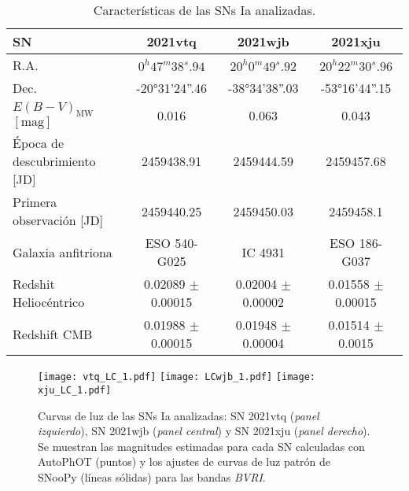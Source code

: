 \documentclass[baaa]{baaa}
\begin{document}
\begin{table*}[t]
\centering
\fontsize{9}{10}\selectfont
\caption{Características de las SNs Ia analizadas.}

\begin{tabular}{lccc}
\hline\hline\noalign{\smallskip}
SN                                                                               & 2021vtq         & 2021wjb         & 2021xju         \\ \hline
R.A.                                                                             & $0^h 47^m 38^s.94$     & $20^h0^m49^s.92$     & $20^h22^m30^s.96$    \\
Dec.                                                                             & -20°31'24''.46 & -38°34'38''.03 & -53°16'44''.15 \\
$E(B-V)_{\mathrm{MW}}$ $[\mathrm{mag}]$ & 0.016 & 0.063  &  0.043 \\
Época de descubrimiento {[}JD{]}                                                 & 2459438.91      & 2459444.59      & 2459457.68      \\
Primera observación {[}JD{]} & 2459440.25      & 2459450.03      & 2459458.1       \\
Galaxia anfitriona                                                                  & ESO 540-G025    & IC 4931         & ESO 186-G037    \\
Redshit Heliocéntrico                                                            & 0.02089 $\pm$ 0.00015 & 0.02004 $\pm$ 0.00002 & 0.01558 $\pm$ 0.00015 \\
Redshift CMB                                                                     & 0.01988 $\pm$ 0.00015 & 0.01948 $\pm$ 0.00004 & 0.01514 $\pm$ 0.0015  \\ \hline
\end{tabular}

\label{t:SNs}
\end{table*}


\begin{figure*}[!ht]
 \centering
   \label{f:vtq}
    \texttt{[image: vtq\_LC\_1.pdf]}
   \label{f:wjb}
    \texttt{[image: LCwjb\_1.pdf]}
       \label{f:wjb}
    \texttt{[image: xju\_LC\_1.pdf]}
 \caption{Curvas de luz de las SNs Ia analizadas: SN 2021vtq ({\em panel izquierdo}), SN 2021wjb ({\em panel central}) y SN 2021xju ({\em panel derecho}). Se muestran las magnitudes estimadas para cada SN calculadas con {\sc AutoPhOT} (puntos) y los ajustes de curvas de luz patrón de {\sc SNooPy} (líneas sólidas) para las bandas \textit{BVRI}.}
 \label{f:LC.SNs}
\end{figure*}
\end{document}
